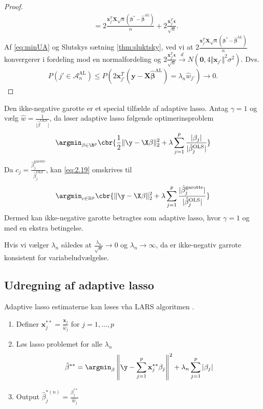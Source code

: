 \begin{proof}
\begin{align*}
&= 2 \frac{\mathbf{x}_{j'}^T \mathbf{X} \sqrt{n} \left(\boldsymbol{\beta}^*-\hat{\boldsymbol{\beta}}^{\text{AL}}\right)}{n}+2\frac{\mathbf{x}_{j'}^T \boldsymbol{\epsilon}}{\sqrt{n}}.
\end{align*}
Af \eqref{eq:minUA} og Slutskys sætning \ref{thm:sluktsky}, ved vi at $ 2 \frac{\mathbf{x}_{j'}^T \mathbf{X} \sqrt{n} \left(\boldsymbol{\beta}^*-\hat{\boldsymbol{\beta}}^{\text{AL}}\right)}{n}$ konvergerer i fordeling mod en normalfordeling og $2\frac{\mathbf{x}_{j'}^T \boldsymbol{\epsilon}}{\sqrt{n}} \overset{d}{\rightarrow} N \left(\mathbf{0}, 4 \Vert \mathbf{x}_{j'} \Vert^2 \sigma^2 \right)$. Dvs.
\begin{align*}
P\left(j' \in \mathcal{A}_n^{\text{AL}}\right) \leq P\left(2 \mathbf{x}_{j'}^T \left(\mathbf{y}-\mathbf{X} \hat{\boldsymbol{\beta}}^{\text{AL}}\right)=\lambda_n \hat{w}_{j'} \right) \rightarrow 0.
\end{align*}
\end{proof}
%
Den ikke-negative garotte er et special tilfælde af adaptive lasso.
Antag \(\gamma=1\) og vælg \(\hat{w}=\frac{1}{\vert \hat{\beta}^{\text{OLS}} \vert}\), da løser adaptive lasso følgende optimerinsproblem
\begin{align*}
\argmin_{\beta \in \R^p} \cbr{\frac{1}{2} \Vert \y - \X \beta \Vert_2^2 + \lambda \sum_{j=1}^p \frac{\vert \beta_j \vert}{\vert \hat{\beta}_j^\text{OLS} \vert}}
\end{align*}
Da \(c_j = \frac{\hat{\beta}_j^\text{garotte}}{\hat{\beta}_j^\text{OLS}}\), kan \eqref{eq:2.19} omskrives til
\begin{align*}
\argmin_{c \in \mathbb{R}^p}  \cbr{\Vert \y - \X \beta \Vert_2^2 + \lambda \sum_{j=1}^p  \frac{\vert\hat{\beta}_j^\text{garotte}\vert}{\vert\hat{\beta}_j^\text{OLS}\vert}}
\end{align*}
Dermed kan ikke-negative garotte betragtes som adaptive lasso, hvor \(\gamma=1\) og med en ekstra betingelse.

Hvis vi vælger \(\lambda_n\) således at \(\frac{\lambda_n}{\sqrt{n}} \rightarrow 0\) og \(\lambda_n \rightarrow \infty\), da er ikke-negativ garrote konsistent for variabeludvælgelse.



\subsection{Udregning af adaptive lasso}
Adaptive lasso estimaterne kan løses vha LARS algoritmen \citep{efron}.
\begin{enumerate}
\item Definer \(\mathbf{x}_j^{**} = \frac{\mathbf{x}_j}{\hat{w}_j}\) for \(j=1, \ldots, p\)
\item Løs lasso problemet for alle \(\lambda_n\)
\begin{align*}
\hat{\beta}^{**} = \argmin_{\beta} \left\Vert \y - \sum_{j=1}^p \mathbf{x}_j^{**} \beta_j \right\Vert^2 + \lambda_n \sum_{j=1}^p \vert \beta_j \vert
\end{align*}
\item Output \(\hat{\beta}_j^{*(n)} = \frac{\beta_j^{**}}{\hat{w}_j}\)
\end{enumerate}